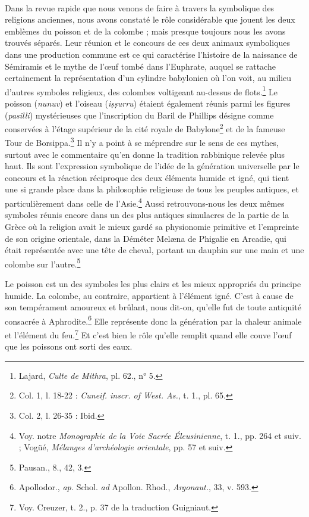 \documentclass[a4paper, 11pt, oneside]{article}
\begin{document}
\paragraph{}
Dans la revue rapide que nous venons de faire à travers la symbolique des religions anciennes, nous avons constaté le rôle considérable que jouent les deux emblèmes du poisson et de la colombe ; mais presque toujours nous les avons trouvés séparés. Leur réunion et le concours de ces deux animaux symboliques dans une production commune est ce qui caractérise l'histoire de la naissance de Sémiramis et le mythe de l'œuf tombé dans l'Euphrate, auquel se rattache certainement la représentation d'un cylindre babylonien où l'on voit, au milieu d'autres symboles religieux, des colombes voltigeant au-dessus de flots.\footnote{Lajard, \emph{Culte de Mithra}, pl. 62., n° 5.} Le poisson (\emph{nunuv}) et l'oiseau (\emph{iṣṣurru}) étaient également réunis parmi les figures (\emph{pasilli}) mystérieuses que l'inscription du Baril de Phillips désigne comme conservées à l'étage supérieur de la cité royale de Babylone\footnote{Col. 1, l. 18-22 : \emph{Cuneif. inscr. of West. As.}, t. 1., pl. 65.} et de la fameuse Tour de Borsippa.\footnote{Col. 2, l. 26-35 : Ibid.} Il n'y a point à se méprendre sur le sens de ces mythes, surtout avec le commentaire qu'en donne la tradition rabbinique relevée plus haut. Ils sont l'expression symbolique de l'idée de la génération universelle par le concours et la réaction réciproque des deux éléments humide et igné, qui tient une si grande place dans la philosophie religieuse de tous les peuples antiques, et particulièrement dans celle de l'Asie.\footnote{Voy. notre \emph{Monographie de la Voie Sacrée Éleusinienne}, t. 1., pp. 264 et suiv. ; Vogüé, \emph{Mélanges d'archéologie orientale}, pp. 57 et suiv.} Aussi retrouvons-nous les deux mêmes symboles réunis encore dans un des plus antiques simulacres de la partie de la Grèce où la religion avait le mieux gardé sa physionomie primitive et l'empreinte de son origine orientale, dans la Déméter Melæna de Phigalie en Arcadie, qui était représentée avec une tête de cheval, portant un dauphin sur une main et une colombe sur l'autre.\footnote{Pausan., 8., 42, 3.}

Le poisson est un des symboles les plus clairs et les mieux appropriés du principe humide. La colombe, au contraire, appartient à l'élément igné. C'est à cause de son tempérament amoureux et brûlant, nous dit-on, qu'elle fut de toute antiquité consacrée à Aphrodite.\footnote{Apollodor., \emph{ap.} Schol. \emph{ad} Apollon. Rhod., \emph{Argonaut.}, 33, v. 593.} Elle représente donc la génération par la chaleur animale et l'élément du feu.\footnote{Voy. Creuzer, t. 2., p. 37 de la traduction Guigniaut.} Et c'est bien le rôle qu'elle remplit quand elle couve l'œuf que les poissons ont sorti des eaux.
\end{document}

